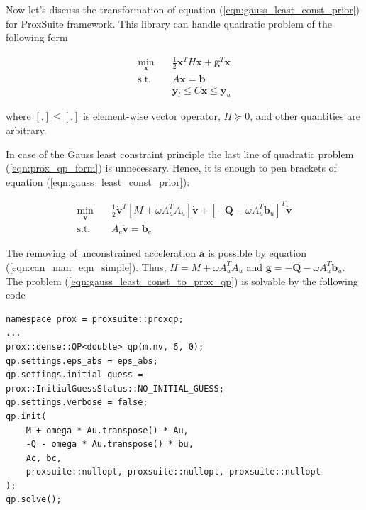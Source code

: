 Now let's discuss the transformation of equation 
(\ref{eqn:gauss_least_const_prior}) for ProxSuite framework. This library can 
handle quadratic problem of the following form

\begin{equation}
    \begin{aligned}
        \min_{\mathbf{x}} \quad & 
        \frac{1}{2} \mathbf{x}^T H \mathbf{x} + 
        \mathbf{g}^T \mathbf{x} \\
        \textrm{s.t.} \quad & A \mathbf{x} = \mathbf{b} \\
        & \mathbf{y}_l \leq C \mathbf{x} \leq \mathbf{y}_u  
    \end{aligned}
    \label{eqn:prox_qp_form}
\end{equation}

where $[.] \leq [.]$ is element-wise vector operator, $H \succeq 0$, and 
other quantities are arbitrary.

In case of the Gauss least constraint principle the last line of quadratic 
problem (\ref{eqn:prox_qp_form}) is unnecessary. Hence, it is enough 
to pen brackets of equation (\ref{eqn:gauss_least_const_prior}):

\begin{equation}
    \begin{aligned}
        \min_{\dot{\mathbf{v}}} \quad & 
        \frac{1}{2} \dot{\mathbf{v}}^T [M + \omega A_u^T A_u] \dot{\mathbf{v}} + 
        [-\mathbf{Q} - \omega A_u^T \mathbf{b}_u]^T \dot{\mathbf{v}} \\
        \textrm{s.t.} \quad & A_c \dot{\mathbf{v}} = \mathbf{b}_c
    \end{aligned}
    \label{eqn:gauss_least_const_to_prox_qp}
\end{equation}

The removing of unconstrained acceleration $\mathbf{a}$ is possible by equation 
(\ref{eqn:can_man_eqn_simple}). Thus, $H = M + \omega A_u^T A_u$ and 
$\mathbf{g} = -\mathbf{Q} - \omega A_u^T \mathbf{b}_u$. The problem 
(\ref{eqn:gauss_least_const_to_prox_qp}) is solvable by the following 
code

\begin{lstlisting}[caption={Quadratic problem solution}, label=snp:qp_sol]
namespace prox = proxsuite::proxqp;
...
prox::dense::QP<double> qp(m.nv, 6, 0);
qp.settings.eps_abs = eps_abs;
qp.settings.initial_guess = prox::InitialGuessStatus::NO_INITIAL_GUESS;
qp.settings.verbose = false;
qp.init(
    M + omega * Au.transpose() * Au,
    -Q - omega * Au.transpose() * bu,
    Ac, bc,
    proxsuite::nullopt, proxsuite::nullopt, proxsuite::nullopt
);
qp.solve();
\end{lstlisting}

